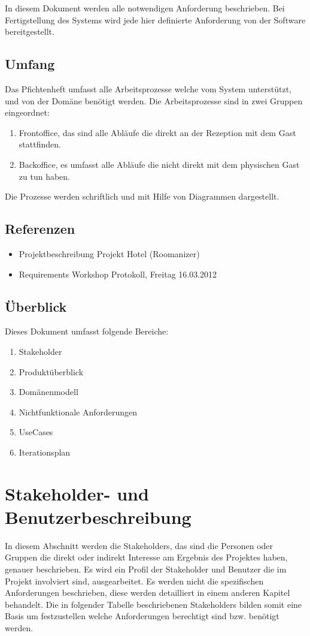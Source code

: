 \documentclass[10pt,a4paper,titlepage]{article}
\begin{document}
In diesem Dokument werden alle notwendigen Anforderung beschrieben. Bei Fertigstellung des Systems wird jede hier definierte Anforderung von der Software bereitgestellt.
\subsection{Umfang}
Das Pfichtenheft umfasst alle Arbeitsprozesse welche vom System unterstützt, und von der Domäne benötigt werden. Die Arbeitsprozesse sind in zwei Gruppen eingeordnet:
\begin{enumerate}
\item \Gls{Frontoffice}, das sind alle Abläufe die direkt an der \Gls{Rezeption} mit dem \Gls{Gast} stattfinden.
\item \Gls{Backoffice}, es umfasst alle Abläufe die nicht direkt mit dem physischen \Gls{Gast} zu tun haben.
\end{enumerate}
Die Prozesse werden schriftlich und mit Hilfe von Diagrammen dargestellt.
\subsection{Referenzen}
\begin{itemize}
	\item Projektbeschreibung Projekt Hotel (Roomanizer) 
	\item Requirements Workshop Protokoll, Freitag 16.03.2012
\end{itemize}
\subsection{Überblick}
Dieses Dokument umfasst folgende Bereiche:
\begin{enumerate}
	\item Stakeholder
        \item Produktüberblick
	\item Domänenmodell
        \item Nichtfunktionale Anforderungen
	\item UseCases
        \item Iterationsplan 
\end{enumerate}

\newpage

\section{Stakeholder- und Benutzerbeschreibung}
In diesem Abschnitt werden die Stakeholders, das sind die Personen oder Gruppen die direkt oder indirekt Interesse am Ergebnis des Projektes haben, genauer beschrieben. Es wird ein Profil der Stakeholder und Benutzer die im Projekt involviert sind, ausgearbeitet. Es werden nicht die spezifischen Anforderungen beschrieben, diese werden detailliert in einem anderen Kapitel behandelt. Die in folgender Tabelle beschriebenen Stakeholders bilden somit eine Basis um festzustellen welche Anforderungen berechtigt sind bzw. benötigt werden. 
\end{document}
